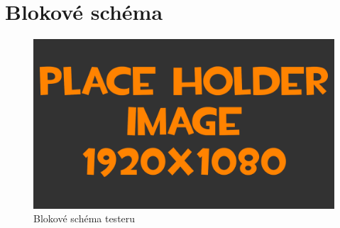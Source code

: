 
\section{Blokové schéma}
\begin{figure}[h!]
	\centering
	\includegraphics[width=\textwidth]{pictures/placeHolderFHD.png}
    	\caption{Blokové schéma testeru}
   	\label{fig:testerSchema}
\end{figure}
